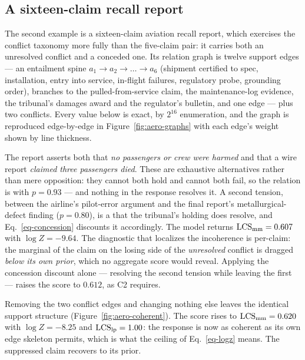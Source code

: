 \subsection{A sixteen-claim recall report}
\label{sec-example-aero}



The second example is a sixteen-claim aviation recall report, which exercises the conflict taxonomy
more fully than the five-claim pair: it carries both an unresolved conflict and a conceded one. Its
relation graph is twelve support edges ---
an entailment spine $a_1\!\to\!a_2\!\to\!\dots\!\to\!a_6$ (shipment certified to spec, installation,
entry into service, in-flight failures, regulatory probe, grounding order), branches to the
pulled-from-service claim, the maintenance-log evidence, the tribunal's damages award and the
regulator's bulletin, and one \eqv{} edge --- plus two conflicts. Every value below is exact, by
$2^{16}$ enumeration, and the graph is reproduced edge-by-edge in Figure~\ref{fig:aero-graphs} with
each edge's weight shown by line thickness.

\begin{example}[Incoherent]
\label{ex-incoherent}
The report asserts both that \emph{no passengers or crew were harmed} and that a wire report
\emph{claimed three passengers died}. These are exhaustive alternatives rather than mere opposition:
they cannot both hold and cannot both fail, so the relation is \exc{} with $p=0.93$ --- and nothing in
the response resolves it. A second tension, between the airline's pilot-error argument and the final
report's metallurgical-defect finding ($p=0.80$), is a  that the tribunal's holding
does resolve, and Eq.~\ref{eq-concession} discounts it accordingly. The model returns
$\mathrm{LCS}_{\mathrm{mm}}=0.607$ with $\log Z=-9.64$. The diagnostic that localizes the incoherence is per-claim: the
marginal of the claim on the losing side of the \emph{unresolved} conflict is dragged \emph{below its
own prior}, which no aggregate score would reveal. Applying the concession discount alone --- resolving
the second tension while leaving the first --- raises the score to $0.612$, as C2 requires.
\end{example}

\begin{example}[Coherent]
\label{ex-coherent}
Removing the two conflict edges and changing nothing else leaves the identical support structure
(Figure~\ref{fig:aero-coherent}). The score rises to $\mathrm{LCS}_{\mathrm{mm}}=0.620$ with $\log Z=-8.25$ and
$\mathrm{LCS}_{\mathrm{lp}}=1.00$: the response is now as coherent as its own edge skeleton permits, which is what the
ceiling of Eq.~\ref{eq-logz} means. The suppressed claim recovers to its prior.
\end{example}

